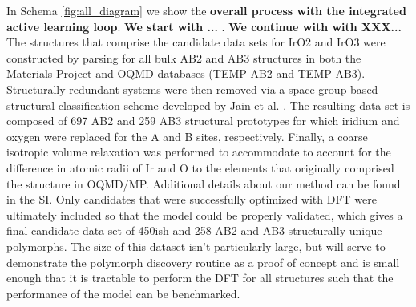 


In Schema \ref{fig:all_diagram} we show the {\bf overall process with the integrated active learning loop}. {\bf We start with ...} .  {\bf We continue with  with XXX...}
The structures that comprise the candidate data sets for IrO2 and IrO3 were constructed by parsing for all bulk AB2 and AB3 structures in both the Materials Project\cite{Jain2013} and OQMD\cite{Kirklin2015} databases (TEMP AB2 and TEMP AB3).
%
Structurally redundant systems were then removed via a space-group based structural classification scheme developed by Jain et al. \cite{Jain2018}.
%
The resulting data set is composed of 697 AB2 and 259 AB3 structural prototypes for which iridium and oxygen were replaced for the A and B sites, respectively.
%
Finally, a coarse isotropic volume relaxation was performed to accommodate to account for the difference in atomic radii of Ir and O to the elements that originally comprised the structure in OQMD/MP.
%
Additional details about our method can be found in the SI.
%
Only candidates that were successfully optimized with DFT were ultimately included so that the model could be properly validated, which gives a final candidate data set of 450ish and 258 AB2 and AB3 structurally unique polymorphs.
%
The size of this dataset isn't particularly large, but will serve to demonstrate the polymorph discovery routine as a proof of concept and is small enough that it is tractable to perform the DFT for all structures such that the performance of the model can be benchmarked.


